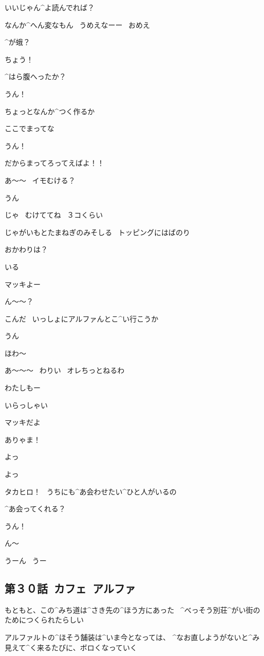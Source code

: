 \T いいじゃん^{よ}{読}んでれば？

\page
\T なんか^{へん}{変}なもん
\ うめえなーー
\ おめえ

\T ^{が}{蛾}？

\M ちょう！

\page
\T ^{はら}{腹}へったか？

\M うん！

\T ちょっとなんか^{つく}{作}るか

\T ここでまってな

\M うん！

\page
\T だからまってろってえばよ！！

\T あ〜〜
\ イモむける？

\M うん

\T じゃ
\ むけててね
\ ３コくらい

\page
\N じゃがいもとたまねぎのみそしる
\ トッピングにはばのり

\T おかわりは？

\M いる

\page
\T マッキよー

\M ん〜〜？

\T こんだ
\ いっしょにアルファんとこ^{い}{行}こうか

\M うん

\page
\T ほわ〜

\T あ〜〜〜
\ わりい
\ オレちっとねるわ

\M わたしもー

\page
\A いらっしゃい

\page
\T マッキだよ

\A ありゃま！

\A よっ

\M よっ

\A タカヒロ！
\ うちにも^{あ}{会}わせたい^{ひと}{人}がいるの

\A ^{あ}{会}ってくれる？

\T うん！

\page
\T ん〜

\T うーん
\ うー


\subsection{第３０話\ カフェ\ アルファ}

\page[94]
\N もともと、この^{みち}{道}は^{さき}{先}の^{ほう}{方}にあった
\ ^{べっそう}{別荘}^{がい}{街}のためにつくられたらしい

\page
\N アルファルトの^{ほそう}{舗装}は^{いま}{今}となっては、
^{なお}{直}しようがないと^{み}{見}えて^{く}{来}るたびに、ボロくなっていく

